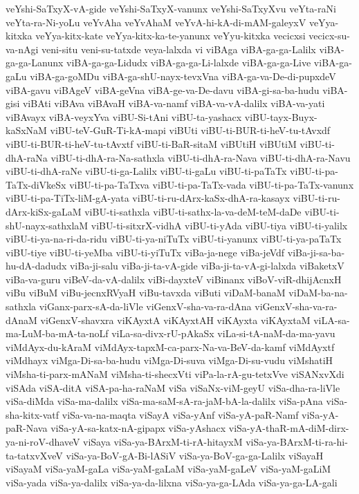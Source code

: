 {veYshi-SaTxyX-vA-gide
veYshi-SaTxyX-vanunx
veYshi-SaTxyXvu
veYta-raNi
veYta-ra-Ni-yoLu
veYvAha
veYvAhaM
veYvA-hi-kA-di-mAM-galeyxV
veYya-kitxka
veYya-kitx-kate
veYya-kitx-ka-te-yanunx
veYyu-kitxka
vecicxsi
vecicx-su-va-nAgi
veni-situ
veni-su-tatxde
veya-lalxda
vi
viBAga
viBA-ga-ga-Lalilx
viBA-ga-ga-Lanunx
viBA-ga-ga-Lidudx
viBA-ga-ga-Li-lalxde
viBA-ga-ga-Live
viBA-ga-gaLu
viBA-ga-goMDu
viBA-ga-shU-nayx-tevxVna
viBA-ga-va-De-di-pupxdeV
viBA-gavu
viBAgeV
viBA-geVna
viBA-ge-va-De-davu
viBA-gi-sa-ba-hudu
viBA-gisi
viBAti
viBAva
viBAvaH
viBA-va-namf
viBA-va-vA-dalilx
viBA-va-yati
viBAvayx
viBA-veyxYva
viBU-Si-tAni
viBU-ta-yashacx
viBU-tayx-Buyx-kaSxNaM
viBU-teV-GuR-Ti-kA-mapi
viBUti
viBU-ti-BUR-ti-heV-tu-tAvxdf
viBU-ti-BUR-ti-heV-tu-tAvxtf
viBU-ti-BaR-sitaM
viBUtiH
viBUtiM
viBU-ti-dhA-raNa
viBU-ti-dhA-ra-Na-sathxla
viBU-ti-dhA-ra-Nava
viBU-ti-dhA-ra-Navu
viBU-ti-dhA-raNe
viBU-ti-ga-Lalilx
viBU-ti-gaLu
viBU-ti-paTaTx
viBU-ti-pa-TaTx-diVkeSx
viBU-ti-pa-TaTxva
viBU-ti-pa-TaTx-vada
viBU-ti-pa-TaTx-vanunx
viBU-ti-pa-TiTx-liM-gA-yata
viBU-ti-ru-dArx-kaSx-dhA-ra-kasayx
viBU-ti-ru-dArx-kiSx-gaLaM
viBU-ti-sathxla
viBU-ti-sathx-la-va-deM-teM-daDe
viBU-ti-shU-nayx-sathxlaM
viBU-ti-sitxrX-vidhA
viBU-ti-yAda
viBU-tiya
viBU-ti-yalilx
viBU-ti-ya-na-ri-da-ridu
viBU-ti-ya-niTuTx
viBU-ti-yanunx
viBU-ti-ya-paTaTx
viBU-tiye
viBU-ti-yeMba
viBU-ti-yiTuTx
viBa-ja-nege
viBa-jeVdf
viBa-ji-sa-ba-hu-dA-dadudx
viBa-ji-salu
viBa-ji-ta-vA-gide
viBa-ji-ta-vA-gi-lalxda
viBaketxV
viBa-va-guru
viBeV-da-vA-dalilx
viBi-dayxteV
viBinanx
viBoV-viR-dhijAcnxH
viBu
viBuM
viBu-jecnxRVyaH
viBu-tavxda
viButi
viDaM-banaM
viDaM-ba-na-sathxla
viGanx-parx-sA-da-liVle
viGenxV-sha-va-ra-dAna
viGenxV-sha-va-ra-dAnaM
viGenxV-shavxra
viKAyxtA
viKAyxtAH
viKAyxta
viKAyxtaM
viLA-sa-ma-LuM-ba-mA-ta-noLf
viLa-sa-divx-rU-pAkaSx
viLa-si-tA-naM-da-ma-yavu
viMdAyx-du-kAraM
viMdAyx-tapxM-ca-parx-Na-va-BeV-da-kamf
viMdAyxtf
viMdhayx
viMga-Di-sa-ba-hudu
viMga-Di-suva
viMga-Di-su-vudu
viMshatiH
viMsha-ti-parx-mANaM
viMsha-ti-shecxVti
viPa-la-rA-gu-tetxVve
viSANxvXdi
viSAda
viSA-ditA
viSA-pa-ha-raNaM
viSa
viSaNx-viM-geyU
viSa-dha-ra-liVle
viSa-diMda
viSa-ma-dalilx
viSa-ma-saM-sA-ra-jaM-bA-la-dalilx
viSa-pAna
viSa-sha-kitx-vatf
viSa-va-na-maqta
viSayA
viSa-yAnf
viSa-yA-paR-Namf
viSa-yA-paR-Nava
viSa-yA-sa-katx-nA-gipapx
viSa-yAshacx
viSa-yA-thaR-mA-diM-dirx-ya-ni-roV-dhaveV
viSaya
viSa-ya-BArxM-ti-rA-hitayxM
viSa-ya-BArxM-ti-ra-hi-ta-tatxvXveV
viSa-ya-BoV-gA-Bi-lASiV
viSa-ya-BoV-ga-ga-Lalilx
viSayaH
viSayaM
viSa-yaM-gaLa
viSa-yaM-gaLaM
viSa-yaM-gaLeV
viSa-yaM-gaLiM
viSa-yada
viSa-ya-dalilx
viSa-ya-da-lilxna
viSa-ya-ga-LAda
viSa-ya-ga-LA-gali
}
